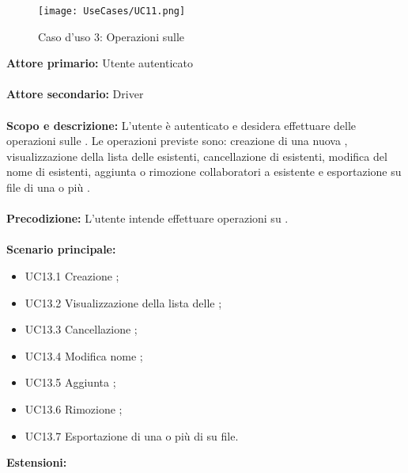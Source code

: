 \documentclass{scalatekids-article}
\begin{document}
\begin{figure}[H]
  \begin{center}
    \texttt{[image: UseCases/UC11.png]}
    \caption*{Caso d'uso 3: Operazioni sulle }
  \end{center}
\end{figure}
\textbf{Attore primario:} Utente autenticato\\ \\
\textbf{Attore secondario:} Driver\\ \\
\textbf{Scopo e descrizione:} L'utente è autenticato e desidera effettuare delle operazioni sulle . Le operazioni previste sono:
creazione di una nuova , visualizzazione della lista delle  esistenti, cancellazione di  esistenti, modifica del nome di  esistenti,
aggiunta o rimozione collaboratori a  esistente e esportazione su file di una o più .\\ \\
\textbf{Precodizione:} L'utente intende effettuare operazioni su .\\ \\
\textbf{Scenario principale:}
\begin{itemize}
\item UC13.1 Creazione ;
\item UC13.2 Visualizzazione della lista delle ;
\item UC13.3 Cancellazione ;
\item UC13.4 Modifica nome ;
\item UC13.5 Aggiunta ;
\item UC13.6 Rimozione ;
\item UC13.7 Esportazione di una o più di  su file.
\end{itemize}
\textbf{Estensioni:}
\end{document}
